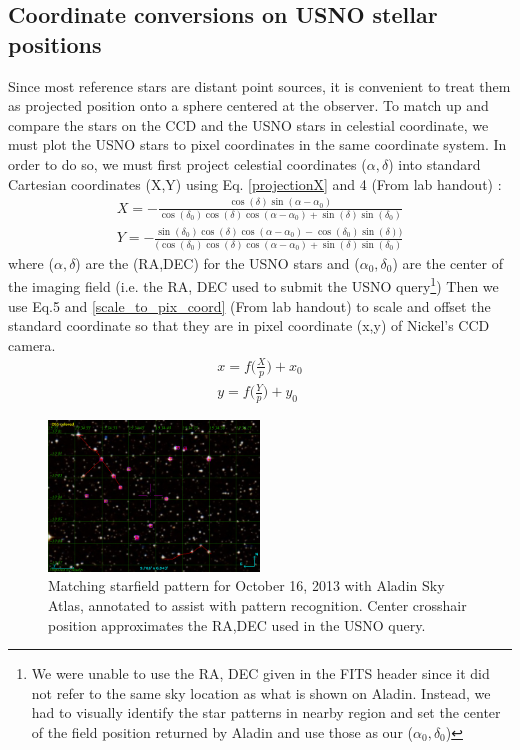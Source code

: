\documentclass[authoryear, 12pt,5p, times]{elsarticle}
\begin{document}
\subsection{Coordinate conversions on USNO stellar positions}\label{usno_coord_conv}
Since most reference stars are distant point sources, it is convenient to treat them as projected position onto a sphere centered at the observer. To match up and compare the stars on the CCD and the USNO stars in celestial coordinate, we must plot the USNO stars to pixel coordinates in the same coordinate system. In order to do so, we must first project celestial coordinates ($\alpha,\delta $) into standard Cartesian coordinates (X,Y) using Eq. \ref{projectionX} and 4 (From lab handout) : 
\begin{align}
X = -\frac{\cos(\delta) \sin(\alpha-\alpha_0)}{\cos(\delta_0)\cos(\delta)\cos(\alpha-\alpha_0)+\sin(\delta) \sin(\delta_0)}
\\ Y= -\frac{\sin(\delta_0)\cos(\delta)\cos(\alpha-\alpha_0)-\cos(\delta_0)\sin(\delta))}{(\cos(\delta_0)\cos(\delta)\cos(\alpha-\alpha_0)+\sin(\delta)\sin(\delta_0)}
\label{projectionX}
\end{align}
where ($\alpha,\delta $) are the (RA,DEC) for the USNO stars and ($\alpha_0,\delta_0$) are the center of the imaging field (i.e. the RA, DEC used to submit the USNO query\footnote{We were unable to use the RA, DEC given in the FITS header since it did not refer to the same sky location as what is shown on Aladin. Instead, we had to visually identify the star patterns in nearby region and set the center of the field position returned by Aladin and use those as our ($\alpha_0,\delta_0$) })
Then we use Eq.5 and \ref{scale_to_pix_coord} (From lab handout) to scale and offset the standard coordinate so that they are in pixel coordinate (x,y)  of Nickel's CCD camera. 
\begin{align}
x  = f \Bigg(\frac{X}{p}\Bigg)+x_0
\\ y  = f \Bigg(\frac{Y}{p}\Bigg)+y_0
\label{scale_to_pix_coord}
\end{align}
\begin{figure}[h!]
\includegraphics[width=0.5\textwidth]{figures/aladin10162013}
\caption{ Matching starfield pattern for October 16, 2013 with Aladin Sky Atlas, annotated to assist with  pattern recognition. Center crosshair position approximates the RA,DEC used in the USNO query. }
\label{aladin10162013}
\end{figure}
\end{document}
